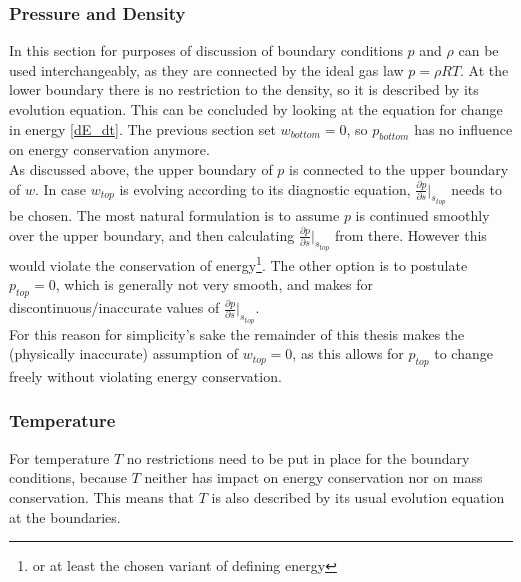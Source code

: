 \subsubsection{Pressure and Density}
In this section for purposes of discussion of boundary conditions $p$ and $\rho$ can be used interchangeably, as they are connected by the ideal gas law $p=\rho RT$.
At the lower boundary there is no restriction to the density, so it is described by its evolution equation.
This can be concluded by looking at the equation for change in energy \ref{dE_dt}.
The previous section set $w_{bottom}=0$, so $p_{bottom}$ has no influence on energy conservation anymore.\\
As discussed above, the upper boundary of $p$ is connected to the upper boundary of $w$.
In case $w_{top}$ is evolving according to its diagnostic equation, $\frac{\partial p}{\partial s}\rvert _{s_{top}}$ needs to be chosen.
The most natural formulation is to assume $p$ is continued smoothly over the upper boundary, and then calculating $\frac{\partial p}{\partial s}\rvert _{s_{top}}$ from there.
However this would violate the conservation of energy\footnote{or at least the chosen variant of defining energy}.
The other option is to postulate $p_{top}=0$, which is generally not very smooth, and makes for discontinuous/inaccurate values of $\frac{\partial p}{\partial s}\rvert _{s_{top}}$.\\
For this reason for simplicity's sake the remainder of this thesis makes the (physically inaccurate) assumption of $w_{top}=0$, as this allows for $p_{top}$ to change freely without violating energy conservation.
\subsubsection{Temperature}
For temperature $T$ no restrictions need to be put in place for the boundary conditions, because $T$ neither has impact on energy conservation nor on mass conservation.
This means that $T$ is also described by its usual evolution equation at the boundaries.

